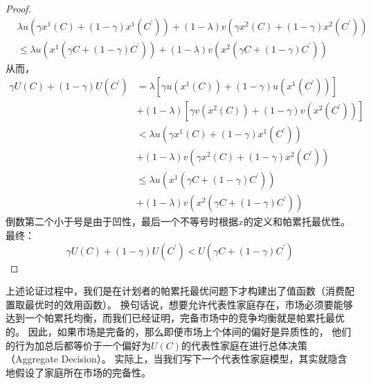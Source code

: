 \begin{proof}
    \begin{equation*}
        \begin{aligned}
            & \lambda u\left(\gamma x^1(C)+(1-\gamma) x^1\left(C^{\prime}\right)\right)
                +(1-\lambda) v\left(\gamma x^2(C)+(1-\gamma) x^2\left(C^{\prime}\right)\right) \\
            &\leq \lambda u\left(x^1\left(\gamma C+(1-\gamma) C^{\prime}\right)\right)
                +(1-\lambda) v\left(x^2\left(\gamma C+(1-\gamma) C^{\prime}\right)\right)
        \end{aligned}
    \end{equation*}
    从而，
    \begin{equation*}
        \begin{aligned}
            \gamma U(C)+(1-\gamma) U\left(C^{\prime}\right)
            &= \lambda\left[\gamma u\left(x^1(C)\right)+(1-\gamma) u\left(x^1\left(C^{\prime}\right)\right)\right] \\
                & +(1-\lambda)\left[\gamma v\left(x^2(C)\right)+(1-\gamma) v\left(x^2\left(C^{\prime}\right)\right)\right] \\
            &< \lambda u\left(\gamma x^1(C)+(1-\gamma) x^1\left(C^{\prime}\right)\right) \\
                &+(1-\lambda) v\left(\gamma x^2(C)+(1-\gamma) x^2\left(C^{\prime}\right)\right) \\
            &\leq \lambda u\left(x^1\left(\gamma C+(1-\gamma) C^{\prime}\right)\right) \\
                &+(1-\lambda) v\left(x^2\left(\gamma C+(1-\gamma) C^{\prime}\right)\right)
        \end{aligned}
    \end{equation*}
    倒数第二个小于号是由于凹性，最后一个不等号时根据$x$的定义和帕累托最优性。最终：
    \begin{equation*}
        \gamma U(C)+(1-\gamma) U\left(C^{\prime}\right) < U\left(\gamma C+\left(1-\gamma\right)C^{\prime}\right)
    \end{equation*}
\end{proof}

上述论证过程中，我们是在计划者的帕累托最优问题下才构建出了值函数（消费配置取最优时的效用函数）。
换句话说，想要允许代表性家庭存在，市场必须要能够达到一个帕累托均衡，而我们已经证明，完备市场中的竞争均衡就是帕累托最优的。
因此，如果市场是完备的，那么即便市场上个体间的偏好是异质性的，
他们的行为加总后都等价于一个偏好为$U\left(C\right)$的代表性家庭在进行总体决策（Aggregate Decision）。
实际上，当我们写下一个代表性家庭模型，其实就隐含地假设了家庭所在市场的完备性。




